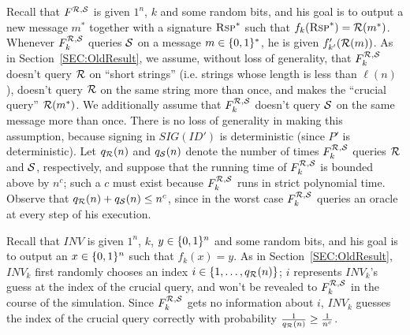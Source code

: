 Recall that $F^{\mathcal{R},\mathcal{S}}$ is given $1^n$, $k$ and some random bits, and
his goal is to output a new message $m^*$ 
together with a signature $\textsc{Rsp}^*$ such that $f_k(\textsc{Rsp}^*) =
\mathcal{R}(m^*)$.  Whenever $F^{\mathcal{R},\mathcal{S}}_k$ queries $\mathcal{S}$ on a message $m \in
\{0,1\}^{*}$, he is given 
$f_{k'}'(\mathcal{R}(m))$. As in Section~\ref{SEC:OldResult}, we assume, without
loss of generality, that $F^{\mathcal{R},\mathcal{S}}_{k}$ doesn't query $\mathcal{R}$ on
``short strings'' (i.e. strings whose length is less than $\ell(n)$), doesn't
query $\mathcal{R}$ on the same string more than once, and makes the ``crucial
query'' $\mathcal{R}(m^*)$.  We additionally assume that $F^{\mathcal{R},\mathcal{S}}_{k}$
doesn't query $\mathcal{S}$ on the same message more than once. There is no loss of
generality in making this assumption, because signing in $SIG(ID')$ is
deterministic (since $P'$ is deterministic).
Let $q_{\mathcal{R}}(n)$ and $q_{\mathcal{S}}(n)$ denote the number of times
$F^{\mathcal{R},\mathcal{S}}_k$ queries $\mathcal{R}$ and $\mathcal{S}$, respectively, and suppose
that the running time of $F^{\mathcal{R},\mathcal{S}}_k$ is bounded above by $n^c$; such a
$c$ must exist because $F^{\mathcal{R},\mathcal{S}}_k$ runs in strict polynomial time.
Observe that $q_{\mathcal{R}}(n) + q_{\mathcal{S}}(n) \leq n^c$, since in the worst case
$F^{\mathcal{R},\mathcal{S}}_{k}$ queries an oracle at every step of his execution.  

Recall that $INV$ is given $1^n$, $k$, $y \in \{0,1\}^{n}$ and some random bits,
and his goal is to output an $x \in \{0,1\}^{n}$ such that $f_k(x) = y$.  As in
Section~\ref{SEC:OldResult}, $INV_k$ first randomly chooses an index 
$i \in \{1,\ldots,q_{\mathcal{R}}(n)\}$; $i$ represents $INV_k$'s guess at the index of
the crucial query, and won't be revealed to $F^{\mathcal{R},\mathcal{S}}_{k}$ in the
course of the simulation. Since $F^{\mathcal{R},\mathcal{S}}_{k}$ gets no information
about $i$, $INV_k$ guesses the index of the crucial query correctly with
probability $\frac{1}{q_{\mathcal{R}}(n)} \geq \frac{1}{n^c}$.

